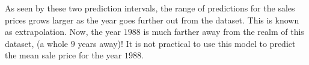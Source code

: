 \documentclass[12pt]{article}
\begin{document}
As seen by these two prediction intervals, the range of predictions for the sales prices grows larger as the year goes further out from the dataset. This is known as extrapolation. Now, the year $1988$ is much farther away from the realm of this dataset, (a whole $9$ years away)! It is not practical to use this model to predict the mean sale price for the year $1988$. 
\end{document}
